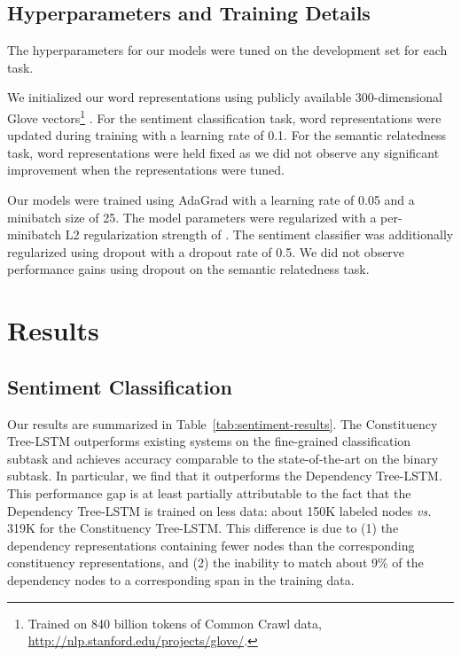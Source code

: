 \documentclass[11pt]{article}
\begin{document}
\subsection{Hyperparameters and Training Details}

The hyperparameters for our models were tuned on the development set for each task.

We initialized our word representations using publicly available 300-dimensional Glove vectors\footnote{Trained on 840 billion tokens of Common Crawl data, \url{http://nlp.stanford.edu/projects/glove/}.} \citep{pennington2014glove}. For the sentiment classification task, word representations were updated during training with a learning rate of 0.1. For the semantic relatedness task, word representations were held fixed as we did not observe any significant improvement when the representations were tuned.

Our models were trained using AdaGrad \citep{duchi2011adaptive} with a learning rate of 0.05 and a minibatch size of 25. The model parameters were regularized with a per-minibatch L2 regularization strength of . The sentiment classifier was additionally regularized using dropout \citep{hinton2012improving} with a dropout rate of 0.5. We did not observe performance gains using dropout on the semantic relatedness task.

\section{Results}
\label{sec:results}

\subsection{Sentiment Classification}

Our results are summarized in Table~\ref{tab:sentiment-results}. The Constituency Tree-LSTM outperforms existing systems on the fine-grained classification subtask and achieves accuracy comparable to the state-of-the-art on the binary subtask. In particular, we find that it outperforms the Dependency Tree-LSTM.  This performance gap is at least partially attributable to the fact that the Dependency Tree-LSTM is trained on less data: about 150K labeled nodes \emph{vs.} 319K for the Constituency Tree-LSTM. This difference is due to (1) the dependency representations containing fewer nodes than the corresponding constituency representations, and (2) the inability to match about 9\% of the dependency nodes to a corresponding span in the training data.
\end{document}
